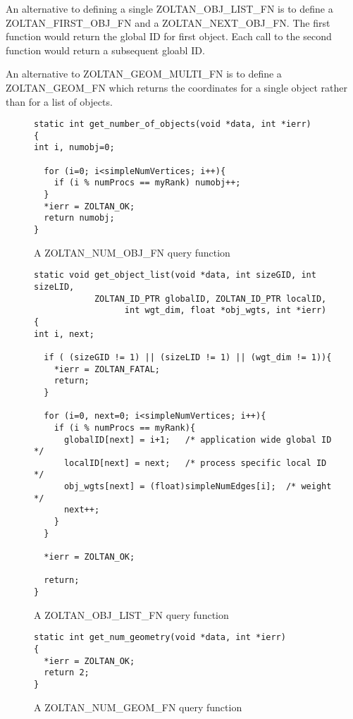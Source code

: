 An alternative to defining a single ZOLTAN\_OBJ\_LIST\_FN is to define
a ZOLTAN\_FIRST\_OBJ\_FN and a ZOLTAN\_NEXT\_OBJ\_FN.  The first function
would return the global ID for first object.  Each call to the second function would
return a subsequent gloabl ID.

An alternative to ZOLTAN\_GEOM\_MULTI\_FN is to define a ZOLTAN\_GEOM\_FN which
returns the coordinates for a single object rather than for a list
of objects.

\begin{figure}
\begin{flushleft}
\begin{verbatim}
static int get_number_of_objects(void *data, int *ierr)
{
int i, numobj=0;

  for (i=0; i<simpleNumVertices; i++){
    if (i % numProcs == myRank) numobj++;
  }
  *ierr = ZOLTAN_OK;
  return numobj;
}
\end{verbatim}
\end{flushleft}
\caption{A ZOLTAN\_NUM\_OBJ\_FN query function}
\label{fig:NumObj}
\end{figure}

\begin{figure}
\begin{flushleft}
\begin{verbatim}
static void get_object_list(void *data, int sizeGID, int sizeLID,
            ZOLTAN_ID_PTR globalID, ZOLTAN_ID_PTR localID,
                  int wgt_dim, float *obj_wgts, int *ierr)
{
int i, next;

  if ( (sizeGID != 1) || (sizeLID != 1) || (wgt_dim != 1)){ 
    *ierr = ZOLTAN_FATAL;
    return;
  }

  for (i=0, next=0; i<simpleNumVertices; i++){
    if (i % numProcs == myRank){
      globalID[next] = i+1;   /* application wide global ID */
      localID[next] = next;   /* process specific local ID  */
      obj_wgts[next] = (float)simpleNumEdges[i];  /* weight */
      next++;
    }
  }

  *ierr = ZOLTAN_OK;

  return;
}
\end{verbatim}
\end{flushleft}
\caption{A ZOLTAN\_OBJ\_LIST\_FN query function}
\label{fig:ObjList}
\end{figure}

\begin{figure}
\begin{flushleft}
\begin{verbatim}
static int get_num_geometry(void *data, int *ierr)
{
  *ierr = ZOLTAN_OK;
  return 2;
}
\end{verbatim}
\end{flushleft}
\caption{A ZOLTAN\_NUM\_GEOM\_FN query function}
\label{fig:NumGeom}
\end{figure}

